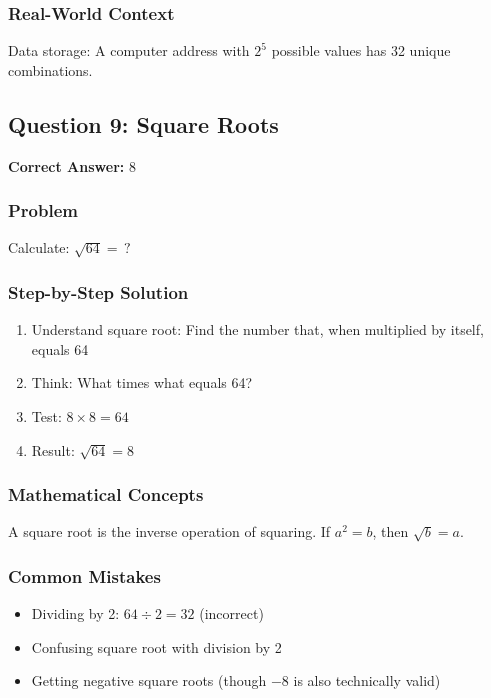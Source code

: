 \documentclass[12pt,a4paper]{article}
\begin{document}
\subsubsection*{Real-World Context}
Data storage: A computer address with $2^5$ possible values has 32 unique combinations.

\vspace{0.5cm}

\subsection*{Question 9: Square Roots}

\textbf{Correct Answer:} $8$

\subsubsection*{Problem}
Calculate: $\sqrt{64} = \,?$

\subsubsection*{Step-by-Step Solution}
\begin{enumerate}
    \item Understand square root: Find the number that, when multiplied by itself, equals 64
    \item Think: What times what equals 64?
    \item Test: $8 \times 8 = 64$
    \item Result: $\sqrt{64} = 8$
\end{enumerate}

\subsubsection*{Mathematical Concepts}
A square root is the inverse operation of squaring. If $a^2 = b$, then $\sqrt{b} = a$.

\subsubsection*{Common Mistakes}
\begin{itemize}
    \item Dividing by 2: $64 \div 2 = 32$ (incorrect)
    \item Confusing square root with division by 2
    \item Getting negative square roots (though $-8$ is also technically valid)
\end{itemize}
\end{document}
